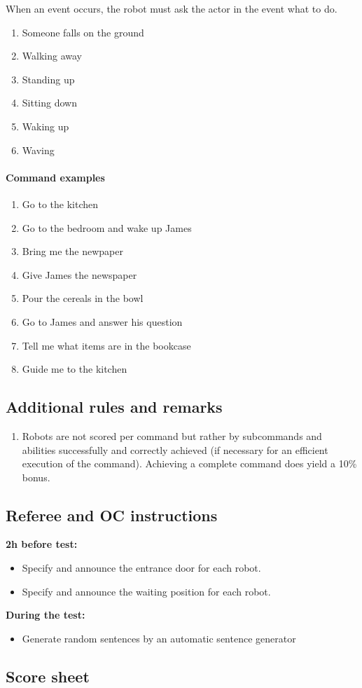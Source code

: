 When an event occurs, the robot must ask the actor in the event what to do. 
\begin{enumerate}
 \item Someone falls on the ground
 \item Walking away
 \item Standing up
 \item Sitting down
 \item Waking up
 \item Waving
\end{enumerate}


\paragraph{Command examples}
\begin{enumerate}
 \item Go to the kitchen
 \item Go to the bedroom and wake up James
 \item Bring me the newpaper
 \item Give James the newspaper
 \item Pour the cereals in the bowl
 \item Go to James and answer his question
 \item Tell me what items are in the bookcase
 \item Guide me to the kitchen
\end{enumerate}

\subsection{Additional rules and remarks}
\label{sec:eegpsr_remarks}
\begin{enumerate}
  \item Robots are not scored per command but rather by subcommands and abilities successfully and correctly achieved (if necessary for an efficient execution of the command). 
    Achieving a complete command does yield a 10\% bonus. 
\end{enumerate}

\subsection{Referee and OC instructions}
\textbf{2h before test:}
\begin{itemize}
\item Specify and announce the entrance door for each robot. 
\item Specify and announce the waiting position for each robot. 
\end{itemize}
\textbf{During the test:}
\begin{itemize}
\item Generate random sentences by an automatic sentence generator
\end{itemize}

\newpage
\subsection{Score sheet}


 
